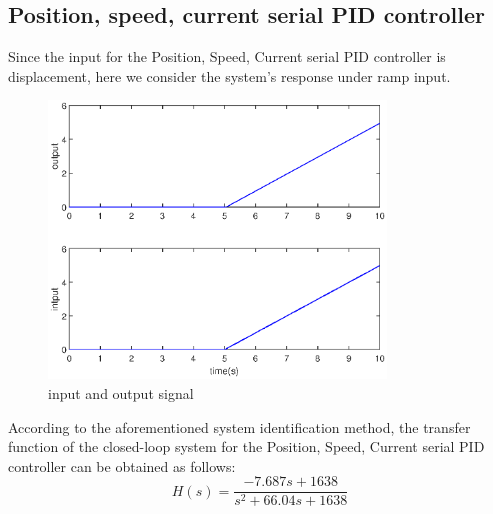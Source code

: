 \documentclass[11pt,a4paper]{article}%
\begin{document}
\newpage
\subsection{Position, speed, current serial PID controller}
Since the input for the Position, Speed, Current serial PID controller is displacement, here we consider the system's response under ramp input.
\begin{figure}[H]
    \centering
    \includegraphics[width=0.8\textwidth]{asd}
    \caption{input and output signal}
    \label{inoutput}
\end{figure}
According to the aforementioned system identification method, the transfer function of the closed-loop system for the Position, Speed, Current serial PID controller can be obtained as follows:
\begin{equation}
    H(s)=\frac{-7.687s + 1638}{s^2 + 66.04s + 1638}
\end{equation}
\end{document}
